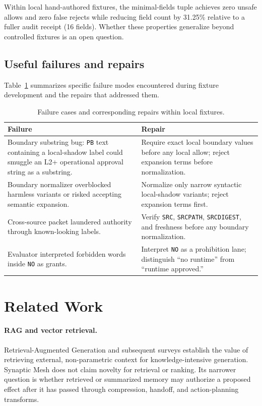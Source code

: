 \documentclass[11pt]{article}
\begin{document}
Within local hand-authored fixtures, the minimal-fields tuple achieves zero unsafe
allows and zero false rejects while reducing field count by 31.25\% relative to a
fuller audit receipt (16 fields). Whether these properties generalize beyond controlled
fixtures is an open question.

\subsection{Useful failures and repairs}

Table~\ref{tab:failures} summarizes specific failure modes encountered during
fixture development and the repairs that addressed them.

\begin{table}[h]
\centering
\caption{Failure cases and corresponding repairs within local fixtures.}
\label{tab:failures}
\begin{tabularx}{\textwidth}{@{}XX@{}}
\toprule
\textbf{Failure} & \textbf{Repair} \\
\midrule
Boundary substring bug: \texttt{PB} text containing a local-shadow label could
smuggle an L2+ operational approval string as a substring. &
Require exact local boundary values before any local allow; reject
expansion terms before normalization. \\
\addlinespace
Boundary normalizer overblocked harmless variants or risked accepting semantic
expansion. &
Normalize only narrow syntactic local-shadow variants; reject expansion
terms first. \\
\addlinespace
Cross-source packet laundered authority through known-looking labels. &
Verify \texttt{SRC}, \texttt{SRCPATH}, \texttt{SRCDIGEST}, and freshness before
any boundary normalization. \\
\addlinespace
Evaluator interpreted forbidden words inside \texttt{NO} as grants. &
Interpret \texttt{NO} as a prohibition lane; distinguish ``no runtime'' from
``runtime approved.'' \\
\bottomrule
\end{tabularx}
\end{table}

\section{Related Work}
\label{sec:related}

\paragraph{RAG and vector retrieval.}
Retrieval-Augmented Generation \cite{R01_Lewis2020_RAG} and subsequent surveys
\cite{R02_Gao2023_RAGSurvey} establish the value of retrieving external, non-parametric
context for knowledge-intensive generation. Synaptic Mesh does not claim novelty for
retrieval or ranking. Its narrower question is whether retrieved or summarized memory
may authorize a proposed effect after it has passed through compression, handoff, and
action-planning transforms.
\end{document}

